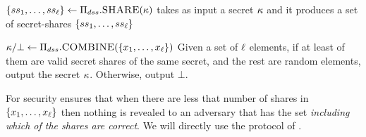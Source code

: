 \itemListStart
\item $\{ ss_{1},\dots, ss_{\ell} \} \gets \Pi_{dss}.\textsc{SHARE}(\kappa)$ takes as input a secret $\kappa$ and it produces a set of secret-shares $\{ ss_{1},\dots, ss_{\ell} \}$
\item $\genericSymmKey/\bot \gets \dssProtocol.\SSCombine(\{\genericSetElmt[1], \dots, \genericSetElmt[\genericVecLen] \})$ Given a set of $\ell$ elements, if at least \threshold of them are valid secret shares of the same secret, and the rest are random elements, output the secret $\kappa$. Otherwise, output $\bot$. 
\itemListEnd

For security \dssProtocol ensures that when there are less that \threshold number of shares in $\{\genericSetElmt[1], \dots, \genericSetElmt[\genericVecLen] \}$ then nothing is revealed to an adversary that has the set \emph{including which of the shares are correct}. We will directly use the protocol of \citet{bhowmick2021apple}. 
\fi 









